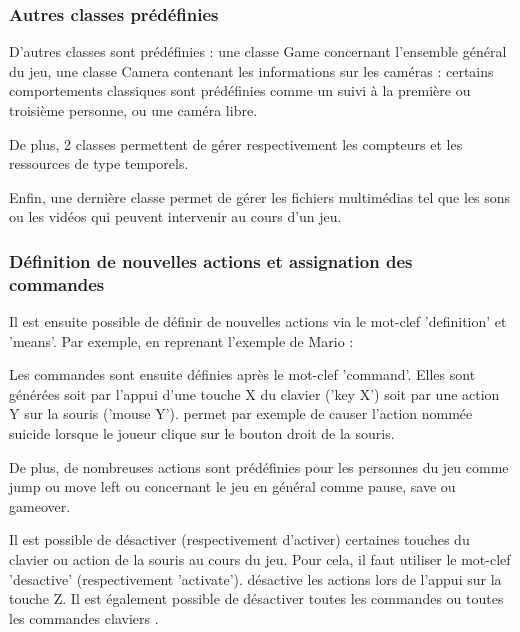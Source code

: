 \subsubsection{Autres classes prédéfinies}

D'autres classes sont prédéfinies : une classe Game concernant l'ensemble général du jeu, une classe Camera contenant les informations sur les caméras :
certains comportements classiques sont prédéfinies comme un suivi à la première ou troisième personne, ou une caméra libre.

De plus, 2 classes permettent de gérer respectivement les compteurs et les ressources de type temporels.

Enfin, une dernière classe permet de gérer les fichiers multimédias tel que les sons ou les vidéos qui peuvent intervenir au cours d'un jeu.

\subsubsection{Définition de nouvelles actions et assignation des commandes}

Il est ensuite possible de définir de nouvelles actions via le mot-clef 'definition' et 'means'.
Par exemple, en reprenant l'exemple de Mario : 

Les commandes sont ensuite définies après le mot-clef 'command'. Elles sont générées soit par l'appui d'une touche X du clavier ('key X') soit par 
une action Y sur la souris ('mouse Y').
 permet par exemple de causer l'action nommée suicide lorsque le joueur clique sur le bouton droit de la souris.

De plus, de nombreuses actions sont prédéfinies pour les personnes du jeu comme jump ou move left ou concernant le jeu en général comme pause, save ou gameover.
 

Il est possible de désactiver (respectivement d'activer) certaines touches du clavier ou action de la souris au cours du jeu.
Pour cela, il faut utiliser le mot-clef 'desactive' (respectivement 'activate').
 désactive les actions lors de l'appui sur la touche Z.
Il est également possible de désactiver toutes les commandes  ou toutes les commandes claviers .


